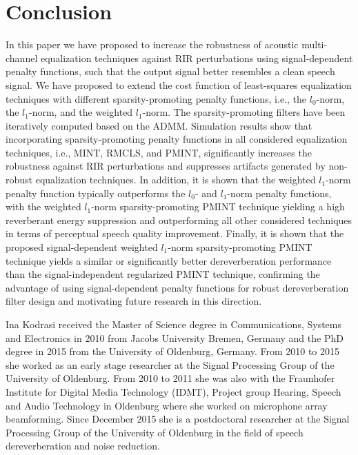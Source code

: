 \documentclass[10pt]{IEEEtran}
\begin{document}
\section{Conclusion}
In this paper we have proposed to increase the robustness of acoustic multi-channel equalization techniques against RIR perturbations using signal-dependent penalty functions, such that the output signal better resembles a clean speech signal.
We have proposed to extend the cost function of least-squares equalization techniques with different sparsity-promoting penalty functions, i.e., the $l_0$-norm, the $l_1$-norm, and the weighted $l_1$-norm.
The sparsity-promoting filters have been iteratively computed based on the ADMM.
Simulation results show that incorporating sparsity-promoting penalty functions in all considered equalization techniques, i.e., MINT, RMCLS, and PMINT, significantly increases the robustness against RIR perturbations and suppresses artifacts generated by non-robust equalization techniques.
In addition, it is shown that the weighted $l_1$-norm penalty function typically outperforms the $l_0$- and $l_1$-norm penalty functions, with the weighted $l_1$-norm sparsity-promoting PMINT technique yielding a high reverberant energy suppression and outperforming all other considered techniques in terms of perceptual speech quality improvement.
Finally, it is shown that the proposed signal-dependent weighted $l_1$-norm sparsity-promoting PMINT technique yields a similar or significantly better dereverberation performance than the signal-independent regularized PMINT technique, confirming the advantage of using signal-dependent penalty functions for robust dereverberation filter design and motivating future research in this direction.





\begin{IEEEbiography}
  {Ina Kodrasi} received the Master of Science degree in Communications, Systems and Electronics in 2010 from Jacobs University Bremen, Germany and the PhD degree in 2015 from the University of Oldenburg, Germany.
  From 2010 to 2015 she worked as an early stage researcher at the Signal Processing Group of the University of Oldenburg.
  From 2010 to 2011 she was also with the Fraunhofer Institute for Digital Media Technology (IDMT), Project group Hearing, Speech and Audio Technology in Oldenburg where she worked on microphone array beamforming.
  Since December 2015 she is a postdoctoral researcher at the Signal Processing Group of the University of Oldenburg in the field of speech dereverberation and noise reduction.

\end{IEEEbiography}
\end{document}
